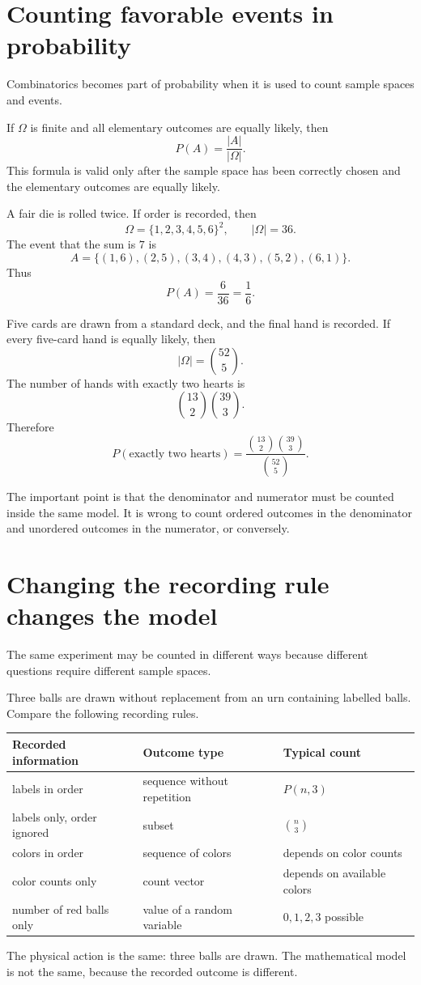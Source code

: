 \section{Counting favorable events in probability}

Combinatorics becomes part of probability when it is used to count sample spaces and events.

If \(\Omega\) is finite and all elementary outcomes are equally likely, then
\[
P(A)=\frac{|A|}{|\Omega|}.
\]
This formula is valid only after the sample space has been correctly chosen and the elementary outcomes are equally likely.

\begin{examplebox}
A fair die is rolled twice. If order is recorded, then
\[
\Omega=\{1,2,3,4,5,6\}^2,\qquad |\Omega|=36.
\]
The event that the sum is \(7\) is
\[
A=\{(1,6),(2,5),(3,4),(4,3),(5,2),(6,1)\}.
\]
Thus
\[
P(A)=\frac{6}{36}=\frac{1}{6}.
\]
\end{examplebox}

\begin{examplebox}
Five cards are drawn from a standard deck, and the final hand is recorded. If every five-card hand is equally likely, then
\[
|\Omega|=\binom{52}{5}.
\]
The number of hands with exactly two hearts is
\[
\binom{13}{2}\binom{39}{3}.
\]
Therefore
\[
P(\text{exactly two hearts})=
\frac{\binom{13}{2}\binom{39}{3}}{\binom{52}{5}}.
\]
\end{examplebox}

The important point is that the denominator and numerator must be counted inside the same model. It is wrong to count ordered outcomes in the denominator and unordered outcomes in the numerator, or conversely.

\section{Changing the recording rule changes the model}

The same experiment may be counted in different ways because different questions require different sample spaces.

\begin{examplebox}
Three balls are drawn without replacement from an urn containing labelled balls. Compare the following recording rules.

\begin{center}
\begin{tabular}{lll}
\toprule
Recorded information & Outcome type & Typical count \\
\midrule
labels in order & sequence without repetition & \(P(n,3)\) \\
labels only, order ignored & subset & \(\binom{n}{3}\) \\
colors in order & sequence of colors & depends on color counts \\
color counts only & count vector & depends on available colors \\
number of red balls only & value of a random variable & \(0,1,2,3\) possible \\
\bottomrule
\end{tabular}
\end{center}
\end{examplebox}

The physical action is the same: three balls are drawn. The mathematical model is not the same, because the recorded outcome is different.
